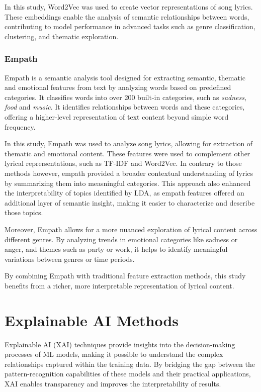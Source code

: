 In this study, Word2Vec was used to create vector representations of song
lyrics. These embeddings enable the analysis of semantic relationships between
words, contributing to model performance in advanced tasks such as genre
classification, clustering, and thematic exploration.



\subsubsection*{Empath}
Empath is a semantic analysis tool designed for extracting
semantic, thematic and emotional features from text by analyzing words based on
predefined categories. It classifies words into over 200 built-in categories,
such as \textit{sadness}, \textit{food} and \textit{music}. It  identifies
relationships between words and these categories, offering a higher-level
representation of text content beyond simple word frequency.\cite{empath}

In this study, Empath was  used to analyze song lyrics, allowing for extraction
of thematic and  emotional content. These features were used to complement
other lyrical reprersentations, such as TF-IDF and Word2Vec. In contrary to
those methods however, empath provided a broader contextual understanding of
lyrics by summarizing them into measningful categories. This approach also
enhanced the interpretability of topics identified by LDA, as empath features
offered an additional layer of semantic insight, making it easier to
characterize and describe those topics.

Moreover, Empath allows for a more nuanced exploration of lyrical content
across different genres. By analyzing trends in emotional categories like
sadness or anger, and themes such as party or work, it helps to identify
meaningful variations between genres or time periods.

By combining Empath with traditional feature extraction methods, this study
benefits from a richer, more interpretable representation of lyrical content.



\section{Explainable AI Methods}
\label{sec:explainableaimethods}


Explainable AI (XAI) techniques provide insights into the decision-making
processes of ML models, making it possible to understand the complex
relationships captured within the training data. By bridging the gap between
the pattern-recognition capabilities of these models and their practical
applications, XAI enables transparency and improves the interpretability of
results.

